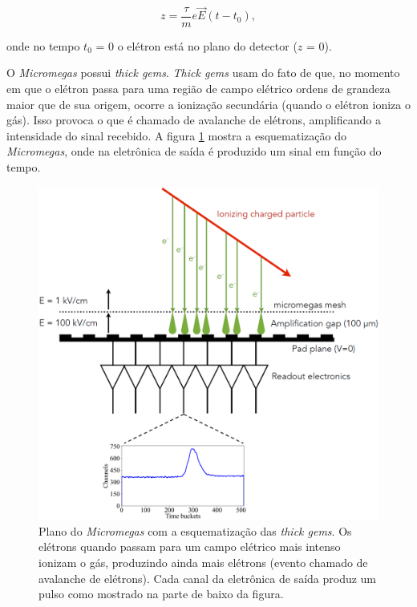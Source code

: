 \documentclass[a4paper,12pt,oneside]{book}
\begin{document}
\begin{equation}
    z = \frac{\tau}{m}e\vec{E}(t - t_0),
\end{equation}

onde no tempo $t_0$ = 0 o elétron está no plano do detector ($z$ = 0).

\par O \textit{Micromegas} possui \textit{thick gems}. \textit{Thick gems} usam do fato de que, no momento em que o elétron passa para uma região de campo elétrico ordens de grandeza maior que de sua origem, ocorre a ionização secundária (quando o elétron ioniza o gás). Isso provoca o que é chamado de avalanche de elétrons, amplificando a intensidade do sinal recebido\cite{GET}. A figura \ref{fig:thick_gems} mostra a esquematização do \textit{Micromegas}, onde na eletrônica de saída é produzido um sinal em função do tempo.

\begin{figure}[H]
    \centering
    \includegraphics[scale = 0.40]{figs/thick_gems_2.png}
    \caption{Plano do \textit{Micromegas} com a esquematização das \textit{thick gems}. Os elétrons quando passam para um campo elétrico mais intenso ionizam o gás, produzindo ainda mais elétrons (evento chamado de avalanche de elétrons). Cada canal da eletrônica de saída produz um pulso como mostrado na parte de baixo da figura.}
    \label{fig:thick_gems}
\end{figure}
\end{document}
